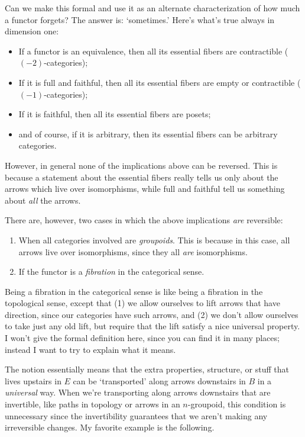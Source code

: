 \documentclass{amsart}
\begin{document}
Can we make this formal and use it as an alternate characterization of
how much a functor forgets?  The answer is: `sometimes.'  Here's
what's true always in dimension one:

\begin{itemize}
\item If a functor is an equivalence, then all its essential fibers
  are contractible ($(-2)$-categories);
\item If it is full and faithful, then all its essential fibers are empty
  or contractible ($(-1)$-categories); 
\item If it is faithful, then all its essential fibers are posets;
\item and of course, if it is arbitrary, then its essential fibers can
  be arbitrary categories.
\end{itemize}

However, in general none of the implications above can be reversed.
This is because a statement about the essential fibers really tells us
only about the arrows which live over isomorphisms, while full and
faithful tell us something about \emph{all} the arrows.

There are, however, two cases in which the above implications
\emph{are} reversible:
\begin{enumerate}
\item When all categories involved are \emph{groupoids}.  This is
  because in this case, all arrows live over isomorphisms, since they
  all \emph{are} isomorphisms.
\item If the functor is a \emph{fibration} in the categorical sense.
\end{enumerate}

Being a fibration in the categorical sense is like being a fibration
in the topological sense, except that (1) we allow ourselves to lift
arrows that have direction, since our categories have such arrows, and
(2) we don't allow ourselves to take just any old lift, but require
that the lift satisfy a nice universal property.  I won't give the
formal definition here, since you can find it in many places; instead
I want to try to explain what it means.

The notion essentially means that the extra properties, structure, or
stuff that lives upstairs in $E$ can be `transported' along arrows
downstairs in $B$ in a \emph{universal} way.  When we're transporting
along arrows downstairs that are invertible, like paths in topology or
arrows in an $n$-groupoid, this condition is unnecessary since the
invertibility guarantees that we aren't making any irreversible
changes.  My favorite example is the following.
\end{document}

